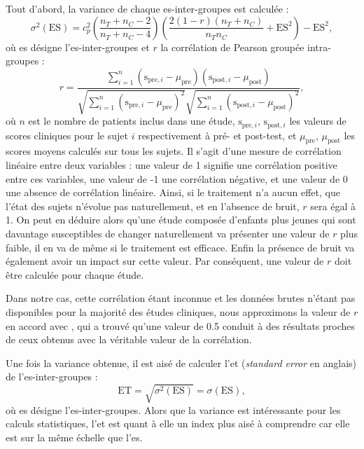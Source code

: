 Tout d'abord, la variance de chaque \gls{es}-inter-groupes est calculée \citep{Morris2008}:
\begin{equation}
\label{eq:metareview_variance_effect_size_between}
\sigma^2(\text{ES}) = c_p^2 \left(
    \frac{n_T + n_C - 2} {n_T + n_C - 4} 
\right ) \left ( 
		\frac{2(1-r)(n_T + n_C)} {n_Tn_C} + \text{ES}^2 
\right) - \text{ES}^2,
\end{equation}
où \gls{es} désigne l'\gls{es}-inter-groupes et $r$ la corrélation de Pearson groupée intra-groupes \citep{James2013} :
\begin{equation}
\label{eq:metareview_within_group_pearson_correlation}
r = \frac{ \sum_{i=1}^{n} (\text{s}_{\text{pre},i} - \mu_{\text{pre}})(\text{s}_{\text{post},i} - \mu_{\text{post}}) } { \sqrt{ \sum_{i=1}^{n} (\text{s}_{\text{pre},i} - 
\mu_{\text{pre}})^2} \sqrt{\sum_{i=1}^{n} (\text{s}_{\text{post},i} - \mu_{\text{post}})^2} }, 
\end{equation}
où $n$ est le nombre de patients inclus dans une étude, $\text{s}_{\text{pre},i}$, $\text{s}_{\text{post},i}$ les valeurs de scores cliniques pour le sujet $i$ 
respectivement à pré- et post-test, et $\mu_{\text{pre}}$, $\mu_{\text{post}}$ les scores moyens calculés sur tous les sujets. 
Il s'agit d'une mesure de corrélation linéaire entre deux variables : une valeur de 1 signifie une corrélation positive entre ces variables,
une valeur de -1 une corrélation négative, et une valeur de 0 une absence de corrélation linéaire. Ainsi, si le traitement n'a aucun effet, 
que l'état des sujets n'évolue pas naturellement, et en l'absence de bruit, $r$ sera égal à 1. On peut en déduire alors qu'une étude 
composée d'enfants plus jeunes qui sont davantage susceptibles de changer naturellement va présenter une valeur de $r$ plus faible, il en va 
de même si le traitement est efficace. Enfin la présence de bruit va également avoir un impact sur cette valeur. Par conséquent, une valeur 
de $r$ doit être calculée pour chaque étude.

Dans notre cas, cette corrélation étant inconnue et les données brutes n'étant pas disponibles pour la majorité des études cliniques, nous approximons la valeur 
de $r$ en accord avec \citet{Balk2012}, qui a trouvé qu'une valeur de 0.5 conduit à des résultats proches de ceux obtenus avec la véritable
valeur de la corrélation.

Une fois la variance obtenue, il est aisé de calculer l'\gls{et} (\textit{standard error} en anglais) de l'\gls{es}-inter-groupes \citep[Chapitre~8]{Borenstein2009} :
\begin{equation}
\label{eq:metareview_standard_error_effect_size_between}
\text{ET} = \sqrt{\sigma^2(\text{ES})} = \sigma(\text{ES}),
\end{equation}
où \gls{es} désigne l'\gls{es}-inter-groupes. Alors que la variance est intéressante pour les calculs statistiques, l'\gls{et} est quant à elle 
un index plus aisé à comprendre car elle est sur la même échelle que l'\gls{es}.


